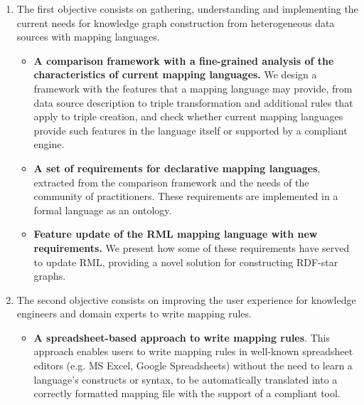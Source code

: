 \begin{enumerate}
    \item The first objective consists on gathering, understanding and implementing the current needs for knowledge graph construction from heterogeneous data sources with mapping languages. 

    \begin{itemize}
        \item \textbf{A comparison framework with a fine-grained analysis of the characteristics of current mapping languages.} We design a framework with the features that a mapping language may provide, from data source description to triple transformation and additional rules that apply to triple creation, and check whether current mapping languages provide such features in the language itself or supported by a compliant engine. 

        \item \textbf{A set of requirements for declarative mapping languages}, extracted from the comparison framework and the needs of the community of practitioners. These requirements are implemented in a formal language as an ontology. 

        \item \textbf{Feature update of the RML mapping language with new requirements.} We present how some of these requirements have served to update RML, providing a novel solution for constructing RDF-star graphs.
        
    \end{itemize}

    \item The second objective consists on improving the user experience for knowledge engineers and domain experts to write mapping rules.

    \begin{itemize}
        \item \textbf{A spreadsheet-based approach to write mapping rules}. This approach enables users to write mapping rules in well-known spreadsheet editors (e.g. MS Excel, Google Spreadsheets) without the need to learn a language's constructs or syntax, to be automatically translated into a correctly formatted mapping file with the support of a compliant tool. 


\end{itemize}
\end{enumerate}
